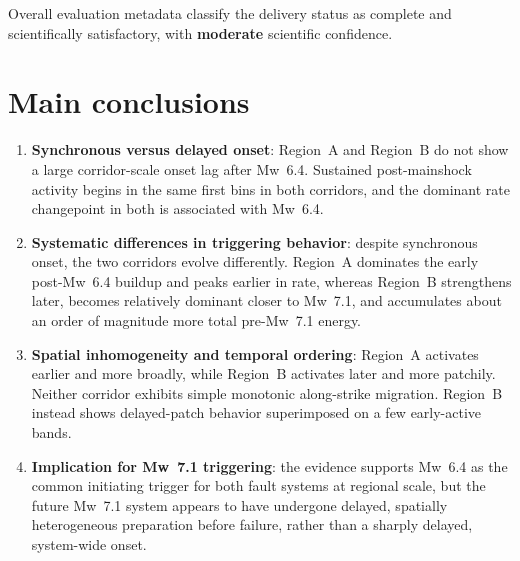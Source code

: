 \documentclass[11pt]{article}
\begin{document}
Overall evaluation metadata classify the delivery status as complete and scientifically satisfactory, with \textbf{moderate} scientific confidence.

\section{Main conclusions}
\begin{enumerate}[label=\arabic*)]
    \item \textbf{Synchronous versus delayed onset}: Region~A and Region~B do not show a large corridor-scale onset lag after Mw~6.4. Sustained post-mainshock activity begins in the same first bins in both corridors, and the dominant rate changepoint in both is associated with Mw~6.4.
    \item \textbf{Systematic differences in triggering behavior}: despite synchronous onset, the two corridors evolve differently. Region~A dominates the early post-Mw~6.4 buildup and peaks earlier in rate, whereas Region~B strengthens later, becomes relatively dominant closer to Mw~7.1, and accumulates about an order of magnitude more total pre-Mw~7.1 energy.
    \item \textbf{Spatial inhomogeneity and temporal ordering}: Region~A activates earlier and more broadly, while Region~B activates later and more patchily. Neither corridor exhibits simple monotonic along-strike migration. Region~B instead shows delayed-patch behavior superimposed on a few early-active bands.
    \item \textbf{Implication for Mw~7.1 triggering}: the evidence supports Mw~6.4 as the common initiating trigger for both fault systems at regional scale, but the future Mw~7.1 system appears to have undergone delayed, spatially heterogeneous preparation before failure, rather than a sharply delayed, system-wide onset.
\end{enumerate}
\end{document}
